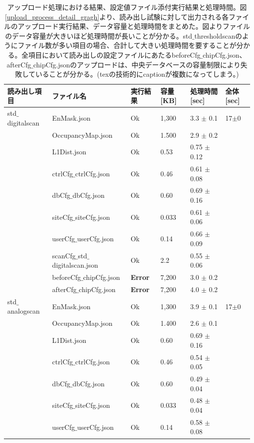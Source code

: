 \begin{longtable}{|llllll|}
  \caption[アップロード処理における結果、設定値ファイル添付実行結果と処理時間]{アップロード処理における結果、設定値ファイル添付実行結果と処理時間。図\ref{upload_process_detail_gragh}より、読み出し試験に対して出力される各ファイルのアップロード実行結果、データ容量と処理時間をまとめた。図よりファイルのデータ容量が大きいほど処理時間が長いことが分かる。std$\_$thresholdscanのようにファイル数が多い項目の場合、合計して大きい処理時間を要することが分かる。全項目において読み出しの設定ファイルにあたるbeforeCfg$\_$chipCfg.json、afterCfg$\_$chipCfg.jsonのアップロードは、中央データベースの容量制限により失敗していることが分かる。(texの技術的にcaptionが複数になってしまう。)}
  \label{upload_status_to_pd}
  \endhead
  \hline
  読み出し項目 & ファイル名 & 実行結果 & 容量[KB] & 処理時間[sec] & 全体[sec]\\ 
  \hline
std$\_$digitalscan & EnMask.json & Ok & 1,300 & 3.3 $\pm$ 0.1 & 17$\pm$0 \\
 & OccupancyMap.json & Ok & 1.500 & 2.9 $\pm$ 0.2 & \\
 & L1Dist.json & Ok & 0.53 & 0.75 $\pm$ 0.12 & \\
 & ctrlCfg$\_$ctrlCfg.json & Ok & 0.46 & 0.61 $\pm$ 0.08 & \\
 & dbCfg$\_$dbCfg.json & Ok & 0.60 & 0.69 $\pm$ 0.16 & \\
 & siteCfg$\_$siteCfg.json & Ok & 0.033 & 0.61 $\pm$ 0.06 & \\
 & userCfg$\_$userCfg.json & Ok & 0.14 & 0.66 $\pm$ 0.09 & \\
 & scanCfg$\_$std$\_$digitalscan.json & Ok & 2.2 & 0.55 $\pm$ 0.06 & \\
 & beforeCfg$\_$chipCfg.json & { \bf Error} & 7,200 & 3.0 $\pm$ 0.2 & \\
 & afterCfg$\_$chipCfg.json & { \bf Error} & 7,200 & 4.0 $\pm$ 0.2 & \\
\hline
std$\_$analogscan & EnMask.json & Ok & 1,300 & 3.9 $\pm$ 0.1 & 17$\pm$0\\
 & OccupancyMap.json & Ok & 1.400 & 2.6 $\pm$ 0.1 & \\
 & L1Dist.json & Ok & 0.60 & 0.69 $\pm$ 0.16 & \\
 & ctrlCfg$\_$ctrlCfg.json & Ok & 0.46 & 0.54 $\pm$ 0.05 & \\
 & dbCfg$\_$dbCfg.json & Ok & 0.60 & 0.49 $\pm$ 0.04 & \\
 & siteCfg$\_$siteCfg.json & Ok & 0.033 & 0.48 $\pm$ 0.04 & \\
 & userCfg$\_$userCfg.json & Ok & 0.14 & 0.58 $\pm$ 0.08 & \\

\end{longtable}
